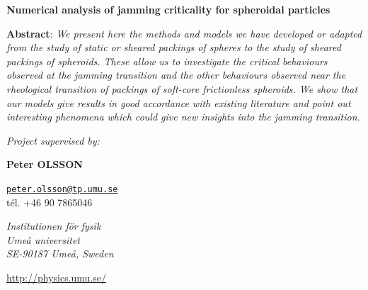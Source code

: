 \documentclass[class=report, float=false, crop=false]{standalone}
\begin{document}
\begin{center}



\vspace{1.5cm}

\textbf{\huge Numerical analysis of jamming criticality for spheroidal particles}



\vspace{2cm}

\parbox{15cm}{\small
\textbf{Abstract}: \it We present here the methods and models we have developed or adapted from the study of static or sheared packings of spheres to the study of sheared packings of spheroids. These allow us to investigate the critical behaviours observed at the jamming transition and the other behaviours observed near the rheological transition of packings of soft-core frictionless spheroids. We show that our models give results in good accordance with existing literature and point out interesting phenomena which could give new insights into the jamming transition.
} %


\vspace{0.5cm}


\vspace{0.5cm}

\parbox{15cm}{

\begin{center}

{\it \small Project supervised by:}

\vspace{0.4cm}

\begin{minipage}{0.3\textwidth}
\centering

{\bf Peter OLSSON}

\href{mailto:peter.olsson@tp.umu.se}{\tt peter.olsson@tp.umu.se} \\ tél. +46 90 7865046


{\it Institutionen för fysik \\ Umeå universitet \\ SE-90187 Umeå, Sweden}

\url{http://physics.umu.se/}

\end{minipage}


\end{center}}
\end{center}
\end{document}
